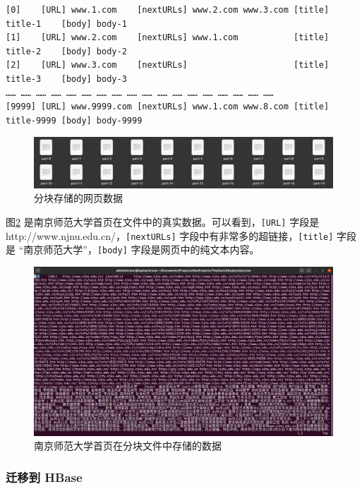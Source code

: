\documentclass{ctexart}
\newcommand{\code}[1]{\colorbox{backcolor}{\lstinline|#1|}}
\begin{document}
    \begin{lstlisting}[basicstyle=\ttfamily\footnotesize]
[0]    [URL] www.1.com    [nextURLs] www.2.com www.3.com [title] title-1    [body] body-1
[1]    [URL] www.2.com    [nextURLs] www.1.com           [title] title-2    [body] body-2
[2]    [URL] www.3.com    [nextURLs]                     [title] title-3    [body] body-3
…… …… …… …… …… …… …… …… …… …… …… …… …… …… …… …… …… ……
[9999] [URL] www.9999.com [nextURLs] www.1.com www.8.com [title] title-9999 [body] body-9999
    \end{lstlisting}

    \begin{figure}[h]
        \centering
        \includegraphics[width=\textwidth]{src/crawl_files}
        \caption{分块存储的网页数据}
        \label{fig:crawl_files}
    \end{figure}

    图\ref{fig:crawl_row} 是南京师范大学首页在文件中的真实数据。可以看到，\code{[URL]} 字段是 http://www.njnu.edu.cn/，\code{[nextURLs]} 字段中有非常多的超链接，\code{[title]} 字段是 “南京师范大学”，\code{[body]} 字段是网页中的纯文本内容。

    \begin{figure}[t]
        \centering
        \includegraphics[width=\textwidth]{src/crawl_row}
        \caption{南京师范大学首页在分块文件中存储的数据}
        \label{fig:crawl_row}
    \end{figure}

    \subsubsection{迁移到 HBase}\label{subsubsec:crawl_migrate}
\end{document}
